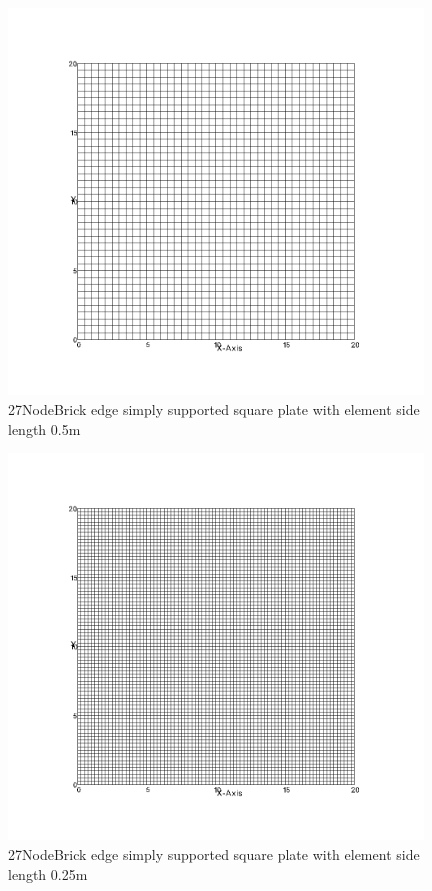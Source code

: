 \documentclass[fleqn,11pt,letter]{article}
\begin{document}
\begin{figure}[H]
  \centering
  \includegraphics[width=11cm]{../Figure_files/27NodeBrick/square_plate5.png}
  \caption{27NodeBrick edge simply supported square plate with element side length 0.5m }
  \label{fig 27NodeBrick edges simply supported square plate with element side length 0.5m }
\end{figure}

\newpage

\begin{figure}[H]
  \centering
  \includegraphics[width=11cm]{../Figure_files/27NodeBrick/square_plate6.png}
  \caption{27NodeBrick edge simply supported square plate with element side length 0.25m }
  \label{fig 27NodeBrick edges simply supported square plate with element side length 0.25m }
\end{figure}
\end{document}
